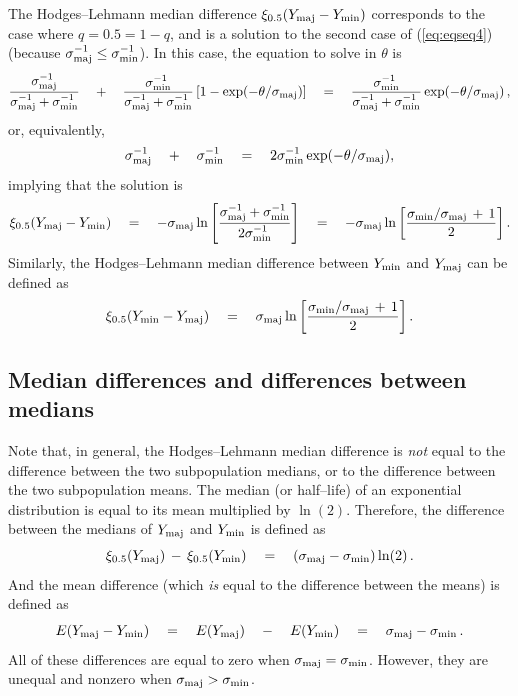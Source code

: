 \documentclass[a4paper]{article}      %
\begin{document}
The Hodges--Lehmann median difference $\xi_{0.5} ( Y_{\rm maj} - Y_{\rm min} )$ corresponds to the case where $q=0.5=1-q$,
and is a solution to the second case of (\ref{eq:eqseq4}) (because $\sigma_{\rm maj}^{-1} \le \sigma_{\rm min}^{-1}$).
In this case, the equation to solve in $\theta$ is
\begin{equation}
{ \sigma_{\rm maj}^{-1} \over {\sigma_{\rm maj}^{-1} + \sigma_{\rm min}^{-1}} }
\quad + \quad { \sigma_{\rm min}^{-1} \over {\sigma_{\rm maj}^{-1} + \sigma_{\rm min}^{-1}} } \left[ 1 - \exp (- \theta/\sigma_{\rm maj}) \right] 
\quad = \quad { \sigma_{\rm min}^{-1} \over {\sigma_{\rm maj}^{-1} + \sigma_{\rm min}^{-1}} } \exp (- \theta/\sigma_{\rm maj}) \, ,
\label{eq:eqseq5}
\end{equation}
or, equivalently,
\begin{equation}
\sigma_{\rm maj}^{-1} \quad + \quad \sigma_{\rm min}^{-1} \quad = \quad 2\sigma_{\rm min}^{-1} \exp (- \theta/\sigma_{\rm maj}),
\label{eq:eqseq6}
\end{equation}
implying that the solution is
\begin{equation}
\xi_{0.5} ( Y_{\rm maj} - Y_{\rm min} ) \quad = \quad - \sigma_{\rm maj} \ln \left[ {{\sigma_{\rm maj}^{-1}+\sigma_{\rm min}^{-1}}\over{2\sigma_{\rm min}^{-1}}} \right]
\quad = \quad - \sigma_{\rm maj} \ln \left[ {{\sigma_{\rm min}/\sigma_{\rm maj} \, + \, 1}\over 2 } \right] .
\label{eq:eqseq7}
\end{equation}
Similarly, the Hodges--Lehmann median difference between $Y_{\rm min}$ and $Y_{\rm maj}$ can be defined as
\begin{equation}
\xi_{0.5} ( Y_{\rm min} - Y_{\rm maj} ) \quad = \quad \sigma_{\rm maj} \ln \left[ {{\sigma_{\rm min}/\sigma_{\rm maj} \, + \, 1}\over 2 } \right] .
\label{eq:eqseq8}
\end{equation}

\subsection{Median differences and differences between medians}

Note that, in general, the Hodges--Lehmann median difference is \textit{not} equal to the difference between the two subpopulation medians,
or to the difference between the two subpopulation means.
The median (or half--life) of an exponential distribution is equal to its mean multiplied by $\ln(2)$.
Therefore, the difference between the medians of $Y_{\rm maj}$ and $Y_{\rm min}$ is defined as
\begin{equation}
\xi_{0.5}(Y_{\rm maj}) \, - \, \xi_{0.5}(Y_{\rm min}) \quad = \quad ( \sigma_{\rm maj} - \sigma_{\rm min} ) \ln (2) \, .
\label{eq:eqseq9}
\end{equation}
And the mean difference (which \textit{is} equal to the difference between the means) is defined as
\begin{equation}
E(Y_{\rm maj} - Y_{\rm min}) \quad = \quad E(Y_{\rm maj}) \quad - \quad E(Y_{\rm min}) \quad = \quad \sigma_{\rm maj} - \sigma_{\rm min} \, .
\label{eq:eqseq10}
\end{equation}
All of these differences are equal to zero when $\sigma_{\rm maj} = \sigma_{\rm min}$.
However, they are unequal and nonzero when $\sigma_{\rm maj}>\sigma_{\rm min}$.
\end{document}
